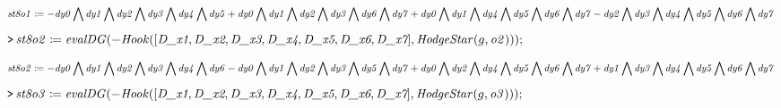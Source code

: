 \documentclass{article}
\begin{document}
\begin{dmath}\label{(18)}
\mathit{st8o1} \coloneqq -\mathit{dy0} \bigwedge  \mathit{dy1}  \bigwedge  \mathit{dy2}  \bigwedge  \mathit{dy3}  \bigwedge  \mathit{dy4} 
\\
 \bigwedge  \mathit{dy5} +\mathit{dy0} \bigwedge  \mathit{dy1}  \bigwedge  \mathit{dy2}  \bigwedge  \mathit{dy3}  \bigwedge  \mathit{dy6} 
\\
 \bigwedge  \mathit{dy7} +\mathit{dy0} \bigwedge  \mathit{dy1}  \bigwedge  \mathit{dy4}  \bigwedge  \mathit{dy5}  \bigwedge  \mathit{dy6} 
\\
 \bigwedge  \mathit{dy7} -\mathit{dy2} \bigwedge  \mathit{dy3}  \bigwedge  \mathit{dy4}  \bigwedge  \mathit{dy5}  \bigwedge  \mathit{dy6} 
\\
 \bigwedge  \mathit{dy7} 
\end{dmath}
\mapleinput
{$ \displaystyle \texttt{>\,} \mathit{st8o2} \coloneqq \mathit{evalDG} (-\mathit{Hook} ([\textit{D\_x1} ,\textit{D\_x2} ,\textit{D\_x3} ,\textit{D\_x4} ,\textit{D\_x5} ,\textit{D\_x6} ,\textit{D\_x7}],\mathit{HodgeStar} (g ,\mathit{o2}))); $}

\begin{dmath}\label{(19)}
\mathit{st8o2} \coloneqq -\mathit{dy0} \bigwedge  \mathit{dy1}  \bigwedge  \mathit{dy2}  \bigwedge  \mathit{dy3}  \bigwedge  \mathit{dy4} 
\\
 \bigwedge  \mathit{dy6} -\mathit{dy0} \bigwedge  \mathit{dy1}  \bigwedge  \mathit{dy2}  \bigwedge  \mathit{dy3}  \bigwedge  \mathit{dy5} 
\\
 \bigwedge  \mathit{dy7} +\mathit{dy0} \bigwedge  \mathit{dy2}  \bigwedge  \mathit{dy4}  \bigwedge  \mathit{dy5}  \bigwedge  \mathit{dy6} 
\\
 \bigwedge  \mathit{dy7} +\mathit{dy1} \bigwedge  \mathit{dy3}  \bigwedge  \mathit{dy4}  \bigwedge  \mathit{dy5}  \bigwedge  \mathit{dy6} 
\\
 \bigwedge  \mathit{dy7} 
\end{dmath}
\mapleinput
{$ \displaystyle \texttt{>\,} \mathit{st8o3} \coloneqq \mathit{evalDG} (-\mathit{Hook} ([\textit{D\_x1} ,\textit{D\_x2} ,\textit{D\_x3} ,\textit{D\_x4} ,\textit{D\_x5} ,\textit{D\_x6} ,\textit{D\_x7}],\mathit{HodgeStar} (g ,\mathit{o3})));\, $}
\end{document}
